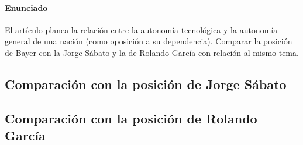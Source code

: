 \paragraph{Enunciado}
El artículo planea la relación entre la autonomía tecnológica y la autonomía
general de una nación (como oposición a su dependencia).
Comparar la posición de Bayer con la Jorge Sábato y la de Rolando García con relación al mismo tema.

\subsection{Comparación con la posición de Jorge Sábato}



\subsection{Comparación con la posición de Rolando García}


